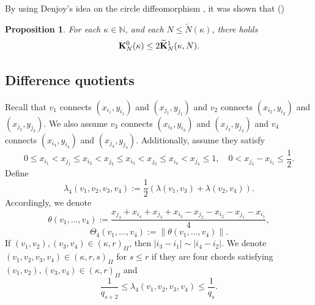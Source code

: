 \documentclass{amsart}
\newtheorem{Proposition}[Definition]{Proposition}
\theoremstyle{definition}
\newcommand{\gm}{\gamma}
\begin{document}
By using Denjoy's idea on the circle diffeomorphism \cite{De}, it was shown that (\cite[Lemma 2.4]{KO1})
\begin{Proposition}\label{ko11}
For each $\kappa\in \mathbb{N}$, and each $N\leq \tilde{N}(\kappa)$, there holds \[\bold{K}_N^0(\kappa)\leq 2 \widetilde{\mathbf{K}}_N^1(\kappa,N).\]
\end{Proposition}
\subsection{Difference quotients}
Recall that $v_1$ connects $(x_{i_1},y_{i_1})$ and  $(x_{j_1},y_{j_1})$ and  $v_2$ connects $(x_{i_2},y_{i_2})$ and  $(x_{j_2},y_{j_2})$.
We also assume $v_3$ connects $(x_{i_3},y_{i_3})$ and  $(x_{j_3},y_{j_3})$ and  $v_4$ connects $(x_{i_4},y_{i_4})$ and  $(x_{j_4},y_{j_4})$. Additionally,
assume they satisfy
\[0\leq x_{i_1}<x_{j_1}\leq x_{i_2}<x_{j_2}\leq x_{i_3}<x_{j_3}\leq x_{i_4}<x_{j_4}\leq 1,\quad 0<x_{j_4}-x_{i_1}\leq \frac{1}{2}. \]
Define
\[\lambda_4(v_1,v_2,v_3,v_4):=\frac{1}{2}(\lambda(v_1,v_3)+\lambda(v_2,v_4)).\]
Accordingly, we denote
\[\theta(v_1,\ldots,v_4):=\frac{x_{j_4}+x_{i_4}+x_{j_3}+x_{i_3}-x_{j_2}-x_{i_2}-x_{j_1}-x_{i_1}}{4},\]
\[ \Theta_4(v_1,\ldots,v_4):=\|\theta(v_1,\ldots,v_4)\|.\]
If $(v_1,v_2), (v_3,v_4)\in (\kappa,r)_{II}$, then $|i_3-i_1|\sim |i_4-i_2|$.
We denote $(v_1,v_2,v_3,v_4)\in (\kappa,r,s)_{II}$ for $s\leq r$ if  they are four  chords satisfying  $(v_1,v_2), (v_3,v_4)\in (\kappa,r)_{II}$ and
\[\frac{1}{q_{s+2}}\leq\lambda_4(v_1,v_2,v_3,v_4)\leq\frac{1}{q_{s}}.\]
\end{document}
